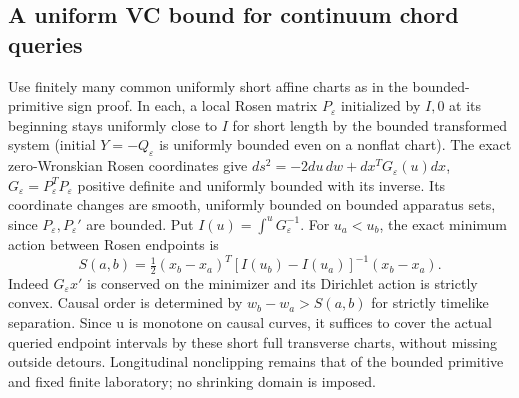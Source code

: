 \documentclass[11pt]{article}
\begin{document}
\subsection{A uniform VC bound for continuum chord queries}\label{a-uniform-vc-bound-for-continuum-chord-queries}

Use finitely many common uniformly short affine charts as in the bounded-primitive sign proof. In each, a local Rosen matrix \(P_\varepsilon\) initialized by \(I,0\) at its beginning stays uniformly close to \(I\) for short length by the bounded transformed system (initial \(Y=-Q_\varepsilon\) is uniformly bounded even on a nonflat chart). The exact zero-Wronskian Rosen coordinates give \(ds^2=-2du\,dw+dx^TG_\varepsilon(u)dx\), \(G_\varepsilon=P_\varepsilon^TP_\varepsilon\) positive definite and uniformly bounded with its inverse. Its coordinate changes are smooth, uniformly bounded on bounded apparatus sets, since \(P_\varepsilon,P_\varepsilon'\) are bounded. Put \(I(u)=\int^u G_\varepsilon^{-1}\). For \(u_a<u_b\), the exact minimum action between Rosen endpoints is
\[
S(a,b)=\tfrac12(x_b-x_a)^T[I(u_b)-I(u_a)]^{-1}(x_b-x_a).
\]
Indeed \(G_\varepsilon x'\) is conserved on the minimizer and its Dirichlet action is strictly convex. Causal order is determined by \(w_b-w_a>S(a,b)\) for strictly timelike separation. Since u is monotone on causal curves, it suffices to cover the actual queried endpoint intervals by these short full transverse charts, without missing outside detours. Longitudinal nonclipping remains that of the bounded primitive and fixed finite laboratory; no shrinking domain is imposed.
\end{document}
